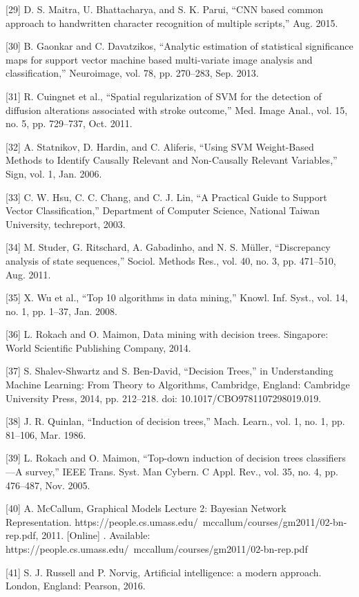 \documentclass[sn-mathphys-num]{sn-jnl}%
\begin{document}
[29] D. S. Maitra, U. Bhattacharya, and S. K. Parui, “CNN based common approach to handwritten character recognition of multiple scripts,” Aug. 2015.

[30] B. Gaonkar and C. Davatzikos, “Analytic estimation of statistical significance maps for support vector machine based multi-variate image analysis and classification,” Neuroimage, vol. 78, pp. 270–283, Sep. 2013.

[31] R. Cuingnet et al., “Spatial regularization of SVM for the detection of diffusion alterations associated with stroke outcome,” Med. Image Anal., vol. 15, no. 5, pp. 729–737, Oct. 2011.

[32] A. Statnikov, D. Hardin, and C. Aliferis, “Using SVM Weight-Based Methods to Identify Causally Relevant and Non-Causally Relevant Variables,” Sign, vol. 1, Jan. 2006.

[33] C. W. Hsu, C. C. Chang, and C. J. Lin, “A Practical Guide to Support Vector Classification,” Department of Computer Science, National Taiwan University, techreport, 2003.

[34] M. Studer, G. Ritschard, A. Gabadinho, and N. S. Müller, “Discrepancy analysis of state sequences,” Sociol. Methods Res., vol. 40, no. 3, pp. 471–510, Aug. 2011.

[35] X. Wu et al., “Top 10 algorithms in data mining,” Knowl. Inf. Syst., vol. 14, no. 1, pp. 1–37, Jan. 2008.

[36] L. Rokach and O. Maimon, Data mining with decision trees. Singapore: World Scientific Publishing Company, 2014.

[37] S. Shalev-Shwartz and S. Ben-David, “Decision Trees,” in Understanding Machine Learning: From Theory to Algorithms, Cambridge, England: Cambridge University Press, 2014, pp. 212–218. doi: 10.1017/CBO9781107298019.019.

[38] J. R. Quinlan, “Induction of decision trees,” Mach. Learn., vol. 1, no. 1, pp. 81–106, Mar. 1986.

[39] L. Rokach and O. Maimon, “Top-down induction of decision trees classifiers—A survey,” IEEE Trans. Syst. Man Cybern. C Appl. Rev., vol. 35, no. 4, pp. 476–487, Nov. 2005.

[40] A. McCallum, Graphical Models Lecture 2: Bayesian Network Representation. https://people.cs.umass.edu/ mccallum/courses/gm2011/02-bn-rep.pdf, 2011. [Online] . Available: https://people.cs.umass.edu/ mccallum/courses/gm2011/02-bn-rep.pdf

[41] S. J. Russell and P. Norvig, Artificial intelligence: a modern approach. London, England: Pearson, 2016.
\end{document}
